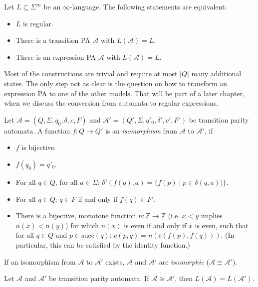 \begin{prop}
	Let $L \subseteq \Sigma^\infty$ be an $\infty$-language. The following statements are equivalent:
	\begin{itemize}
		\item $L$ is regular.
		\item There is a transition PA $\mathcal{A}$ with $L(\mathcal{A}) = L$.
		\item There is an expression PA $\mathcal{A}$ with $L(\mathcal{A}) = L$.
	\end{itemize}
\end{prop}

Most of the constructions are trivial and require at most $|Q|$ many additional states. The only step not as clear is the question on how to transform an expression PA to one of the other models. That will be part of a later chapter, when we discuss the conversion from automata to regular expressions. 



\begin{defn}
	Let $\mathcal{A} = (Q, \Sigma, q_0, \delta, c, F)$ and $\mathcal{A}' = (Q', \Sigma, q'_0, \delta', c', F')$ be transition parity automata. A function $f : Q \rightarrow Q'$ is an \emph{isomorphism} from $\mathcal{A}$ to $\mathcal{A}'$, if
	\begin{itemize}
		\item $f$ is bijective.
		\item $f(q_0) = q'_0$.
		\item For all $q \in Q$, for all $a \in \Sigma$: $\delta'(f(q), a) = \{f(p) \mid p \in \delta(q, a))\}$.
		\item For all $q \in Q$: $q \in F$ if and only if $f(q) \in F'$.
		\item There is a bijective, monotone function $n : \mathbb{Z} \rightarrow \mathbb{Z}$ (i.e. $x < y$ implies $n(x) < n(y)$) for which $n(x)$ is even if and only if $x$ is even, such that for all $q \in Q$ and $p \in \text{succ}(q)$: $c(p, q) = n(c(f(p), f(q)))$. (In particular, this can be satisfied by the identity function.)
	\end{itemize}
	
	If an isomorphism from $\mathcal{A}$ to $\mathcal{A}'$ exists, $\mathcal{A}$ and $\mathcal{A}'$ are \emph{isomorphic} ($\mathcal{A} \cong \mathcal{A}'$).
\end{defn}


\begin{prop}
	Let $\mathcal{A}$ and $\mathcal{A}'$ be transition parity automata. If $\mathcal{A} \cong \mathcal{A}'$, then $L(\mathcal{A}) = L(\mathcal{A}')$.
\end{prop}

